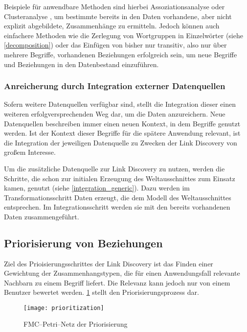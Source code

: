 Beispiele für anwendbare Methoden sind hierbei Assoziationsanalyse \cite[S. 328f.]{pt2013} oder Clusteranalyse \cite[S. 443f.]{hkp2012}, um bestimmte bereits in den Daten vorhandene, aber nicht explizit abgebildete, Zusammenhänge zu ermitteln. Jedoch können auch einfachere Methoden wie die Zerlegung von Wortgruppen in Einzelwörter (siehe \cref{decomposition}) oder das Einfügen von bisher nur transitiv, also nur über mehrere Begriffe, vorhandenen Beziehungen erfolgreich sein, um neue Begriffe und Beziehungen in den Datenbestand einzuführen.

\subsubsection{Anreicherung durch Integration externer Datenquellen}
\label{enrichment_external}

Sofern weitere Datenquellen verfügbar sind, stellt die Integration dieser einen weiteren erfolgversprechenden Weg dar, um die Daten anzureichern. Neue Datenquellen beschreiben immer einen neuen Kontext, in dem Begriffe genutzt werden. Ist der Kontext dieser Begriffe für die spätere Anwendung relevant, ist die Integration der jeweiligen Datenquelle zu Zwecken der Link Discovery von großem Interesse.

Um die zusätzliche Datenquelle zur Link Discovery zu nutzen, werden die Schritte, die schon zur initialen Erzeugung des Weltausschnittes zum Einsatz kamen, genutzt (siehe \cref{integration_generic}). Dazu werden im Transformationsschritt Daten erzeugt, die dem Modell des Weltausschnittes entsprechen. Im Integrationsschritt werden sie mit den bereits vorhandenen Daten zusammengeführt.

\subsection{Priorisierung von Beziehungen}
\label{prioritization}

Ziel des Prioisierungsschrittes der Link Discovery ist das Finden einer Gewichtung der Zusammenhangstypen, die für einen Anwendungsfall relevante Nachbarn zu einem Begriff liefert. Die Relevanz kann jedoch nur von einem Benutzer bewertet werden. \cref{fig:prioritization} stellt den Priorisierungsprozess dar.

\begin{figure}
\centering
\texttt{[image: prioritization]}
\caption{FMC--Petri--Netz der Priorisierung}
\label{fig:prioritization}
\end{figure}

